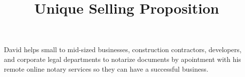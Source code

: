 \documentclass{article}
\title{Unique Selling Proposition}
\begin{document}
\maketitle

David helps small to mid-sized businesses, construction contractors,
developers, and corporate legal departments to notarize documents by apointment
with his remote online notary services so they can have a successful business.
\end{document}
